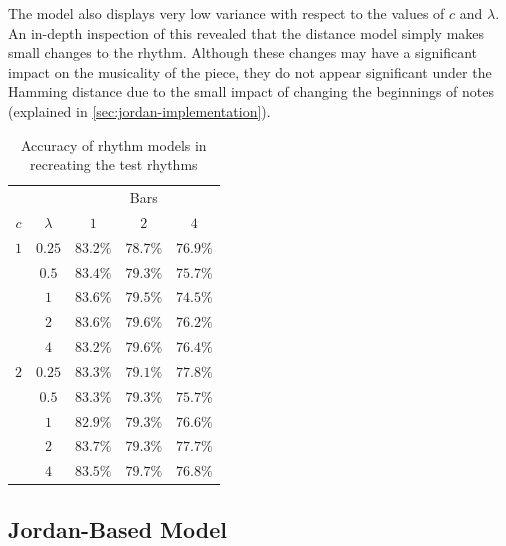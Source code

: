 \documentclass[ author={Stephen Livermore-Tozer},
				supervisor={Dr. Peter Flach},
				degree={MEng},
				title={Algorithmic Co-composition Using Machine Learning},
				subtitle={},
				type={research},
				year={2016} ]{dissertation}
\begin{document}
	The model also displays very low variance with respect to the values of $c$ and $\lambda$. An in-depth inspection of this revealed that the distance model simply makes small changes to the rhythm. Although these changes may have a significant impact on the musicality of the piece, they do not appear significant under the Hamming distance due to the small impact of changing the beginnings of notes (explained in \ref{sec:jordan-implementation}).
	
	\begin{table}[htp]
		\begin{center}
			\begin{tabular}{ccccc}
				\toprule
				& & \multicolumn{3}{c}{Bars}\\
				\cline{3-5}
				$c$ & $\lambda$ & $1$ & $2$ & $4$\\
				\hline
				$1$ & $0.25$ & $83.2\%$ & $78.7\%$ & $76.9\%$\\
				& $0.5$      & $83.4\%$ & $79.3\%$ & $75.7\%$\\
				& $1$        & $83.6\%$ & $79.5\%$ & $74.5\%$\\
				& $2$        & $83.6\%$ & $79.6\%$ & $76.2\%$\\
				& $4$        & $83.2\%$ & $79.6\%$ & $76.4\%$\\
				$2$ & $0.25$ & $83.3\%$ & $79.1\%$ & $77.8\%$\\
				& $0.5$      & $83.3\%$ & $79.3\%$ & $75.7\%$\\
				& $1$        & $82.9\%$ & $79.3\%$ & $76.6\%$\\
				& $2$        & $83.7\%$ & $79.3\%$ & $77.7\%$\\
				& $4$        & $83.5\%$ & $79.7\%$ & $76.8\%$\\
				\bottomrule
			\end{tabular}
		\end{center}
		\caption{Accuracy of rhythm models in recreating the test rhythms}
		\label{tab:rhythm-model-results}
	\end{table}
	
	
	\subsection{Jordan-Based Model}
	\label{sec:objective-jordan}
	
\end{document}
